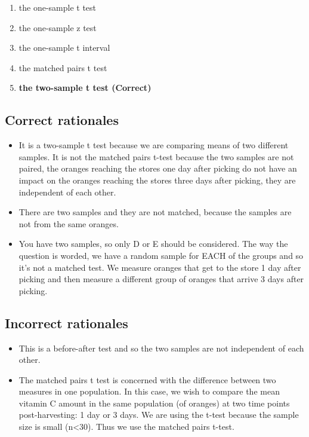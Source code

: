 \documentclass[letterpaper,9pt,twoside,printwatermark=false]{pinp}
\providecommand{\tightlist}{%
  \setlength{\itemsep}{0pt}\setlength{\parskip}{0pt}}
\begin{document}
\begin{enumerate}
\def\labelenumi{\alph{enumi}.}
\tightlist
\item
  the one-sample t test
\item
  the one-sample z test
\item
  the one-sample t interval
\item
  the matched pairs t test
\item
  \textbf{the two-sample t test (Correct)}
\end{enumerate}

\subsection{Correct rationales}\label{correct-rationales-4}

\begin{itemize}
\tightlist
\item
  It is a two-sample t test because we are comparing means of two
  different samples. It is not the matched pairs t-test because the two
  samples are not paired, the oranges reaching the stores one day after
  picking do not have an impact on the oranges reaching the stores three
  days after picking, they are independent of each other.
\item
  There are two samples and they are not matched, because the samples
  are not from the same oranges.
\item
  You have two samples, so only D or E should be considered. The way the
  question is worded, we have a random sample for EACH of the groups and
  so it's not a matched test. We measure oranges that get to the store 1
  day after picking and then measure a different group of oranges that
  arrive 3 days after picking.
\end{itemize}

\subsection{Incorrect rationales}\label{incorrect-rationales-4}

\begin{itemize}
\tightlist
\item
  This is a before-after test and so the two samples are not independent
  of each other.
\item
  The matched pairs t test is concerned with the difference between two
  measures in one population. In this case, we wish to compare the mean
  vitamin C amount in the same population (of oranges) at two time
  points post-harvesting: 1 day or 3 days. We are using the t-test
  because the sample size is small (n\textless{}30). Thus we use the
  matched pairs t-test.
\end{itemize}
\end{document}
